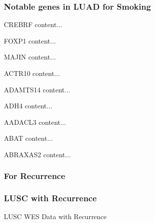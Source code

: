 \documentclass{beamer}
\begin{document}
    \begin{frame}[allowframebreaks]
        \frametitle{Notable genes in LUAD for Smoking}

        \begin{block}{CREBRF}
            content...
        \end{block}

        \begin{block}{FOXP1}
            content...
        \end{block}

        \begin{block}{MAJIN}
            content...
        \end{block}

        \begin{block}{ACTR10}
            content...
        \end{block}

        \begin{block}{ADAMTS14}
            content...
        \end{block}

        \begin{block}{ADH4}
            content...
        \end{block}

        \begin{block}{AADACL3}
            content...
        \end{block}

        \begin{block}{ABAT}
            content...
        \end{block}

        \begin{block}{ABRAXAS2}
            content...
        \end{block}
    \end{frame}

    \subsubsection{For Recurrence}
    \begin{frame}
        \frametitle{LUSC with Recurrence}

        \begin{table}
            \caption{LUSC WES Data with Recurrence}
            \resizebox{!}{0.3 \textheight}
            {}
        \end{table}
    \end{frame}
\end{document}
